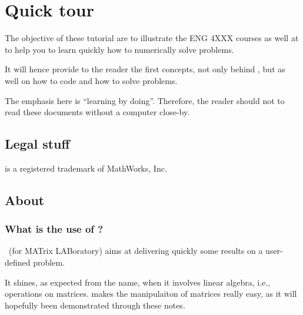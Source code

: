 



\chapter{Quick tour \matlab}
	The objective of these tutorial are to illustrate the ENG 4XXX courses as well at to help you to learn quickly how to numerically solve problems.
	
	It will hence provide to the reader the first concepts, not only behind \matlab, but as well on how to code and how to solve problems.
	
	The emphasis here is “learning by doing”. Therefore, the reader should not to read these documents without a computer close-by.

\section*{Legal stuff}
\matlab is a registered trademark of MathWorks, Inc. 




\section{About \matlab}
	\subsection{What is the use of \matlab ?}
		\matlab~(for MATrix LABoratory) aims at delivering quickly some results on a user-defined problem.

		It shines, as expected from the name, when it involves linear algebra, i.e., operations on matrices.
		\matlab makes the manipulaiton of matrices really easy, as it will hopefully been demonstrated through these notes.

